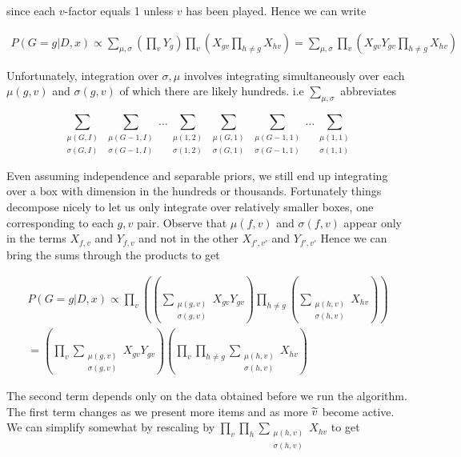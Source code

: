 \documentclass[12pt]{article}
\theoremstyle{definition}
\newcommand{\si}{\ensuremath{\sigma}}
\newcommand{\0}{\ensuremath{\varnothing}}
\newcommand{\wt}{\ensuremath{\widetilde}}
\newcommand{\1}{{\bf 1}}
\begin{document}
  since each $v$-factor equals 1 unless $v$ has been played. Hence we can write
  
  
  \begin{align}  P(G=g| D,x) \propto  \sum_{\mu,\sigma} \left( \prod_v Y_g \right)    \prod_v \left( X_{g v}\prod_{h \ne g}  X_{hv}  \right)  = \sum_{\mu,\sigma}    \prod_v \left( X_{g v} Y_{gv} \prod_{h \ne g}  X_{hv}  \right)
  \end{align}
  
  Unfortunately, integration over $\si,\mu$ involves integrating simultaneously over each $\mu(g,v)$ and $\si(g,v)$ of which there are likely hundreds. i.e $\sum_{\mu ,\sigma}$ abbreviates 
  
  $$   \sum_{\substack{\mu(G,I)\\ \si(G,I)}} \sum_{\substack{\mu(G-1,I)\\ \si(G-1,I)}} \ldots \sum_{\substack{\mu(1,2)\\ \si(1,2)}}   \sum_{\substack{\mu(G,1)\\ \si(G,1)}} \sum_{\substack{\mu(G-1,1)\\ \si(G-1,1)}} \ldots \sum_{\substack{\mu(1,1)\\ \si(1,1)}}$$
  
  
  Even assuming independence and separable priors, we still end up integrating over a box with dimension in the hundreds or thousands. Fortunately things decompose nicely to let us only integrate over relatively smaller boxes, one corresponding to each $g,v$ pair.
  Observe that $\mu(f,v)$ and $\si(f,v)$ appear only in the terms $X_{f,v} $ and $ Y_{f,v}$ and not in the other $X_{f',v'} $ and $ Y_{f',v'}$  Hence we can bring the sums through the products to get
  
  \begin{align}    P(G=g| D,x) \propto  \prod_v \left(  \left( \sum_{\substack{\mu(g,v)\\ \si(g,v)}} X_{g v} Y_{gv} \right) \prod_{h \ne g} \left(  \sum_{\substack{\mu(h,v)\\ \si(h,v)}} X_{hv}  \right) \right)\\
  = \left(  \prod_v   \sum_{\substack{\mu(g,v)\\ \si(g,v)}} X_{g v} Y_{gv} \right)\left( \prod_v \prod_{h \ne g} \sum_{\substack{\mu(h,v)\\ \si(h,v)}} X_{h v}   \right)
  \end{align}
  
  The second term depends only on the data obtained before we run the algorithm. The first term changes as we present more items and as more $\wt v$ become active. We can simplify somewhat by rescaling by $ \prod_v \prod_{h} \sum_{\substack{\mu(h,v)\\ \si(h,v)}} X_{h v} $ to get
   
\end{document}
